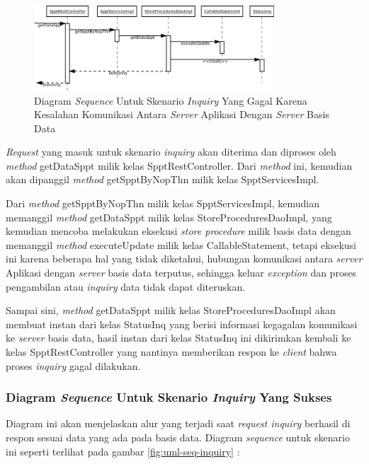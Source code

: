 \documentclass[pdftex,12pt, oneside]{article}
\begin{document}
\begin{figure}[H]
  \centering
  \includegraphics[width=0.8\textwidth]{./resources/uml/uml-seq-inq-db-error}
  \caption{Diagram \textit{Sequence} Untuk Skenario \textit{Inquiry} Yang Gagal Karena Kesalahan Komunikasi Antara \textit{Server} Aplikasi Dengan \textit{Server} Basis Data}
  \label{fig:uml-seq-inq-db-error}
\end{figure}

\textit{Request} yang masuk untuk skenario \textit{inquiry} akan diterima dan diproses oleh \textit{method} getDataSppt milik kelas SpptRestController. Dari \textit{method} ini, kemudian akan dipanggil \textit{method} getSpptByNopThn milik kelas SpptServicesImpl.

Dari \textit{method} getSpptByNopThn milik kelas SpptServicesImpl, kemudian memanggil \textit{method} getDataSppt milik kelas StoreProceduresDaoImpl, yang kemudian mencoba melakukan eksekusi \textit{store procedure} milik basis data dengan memanggil \textit{method} executeUpdate milik kelas CallableStatement, tetapi eksekusi ini karena beberapa hal yang tidak diketahui, hubungan komunikasi antara \textit{server} Aplikasi dengan \textit{server} basis data terputus, sehingga keluar \textit{exception} dan proses pengambilan atau \textit{inquiry} data tidak dapat diteruskan.

Sampai sini, \textit{method} getDataSppt milik kelas StoreProceduresDaoImpl akan membuat instan dari kelas StatusInq yang berisi informasi kegagalan komunikasi ke \textit{server} basis data, hasil instan dari kelas StatusInq ini dikirimkan kembali ke kelas SpptRestController yang nantinya memberikan respon ke \textit{client} bahwa proses \textit{inquiry} gagal dilakukan.

\subsubsection{Diagram \textit{Sequence} Untuk Skenario \textit{Inquiry} Yang Sukses}

Diagram ini akan menjelaskan alur yang terjadi saat \textit{request inquiry} berhasil di respon sesuai data yang ada pada basis data. Diagram \textit{sequence} untuk skenario ini seperti terlihat pada gambar \ref{fig:uml-seq-inquiry} :
\end{document}
